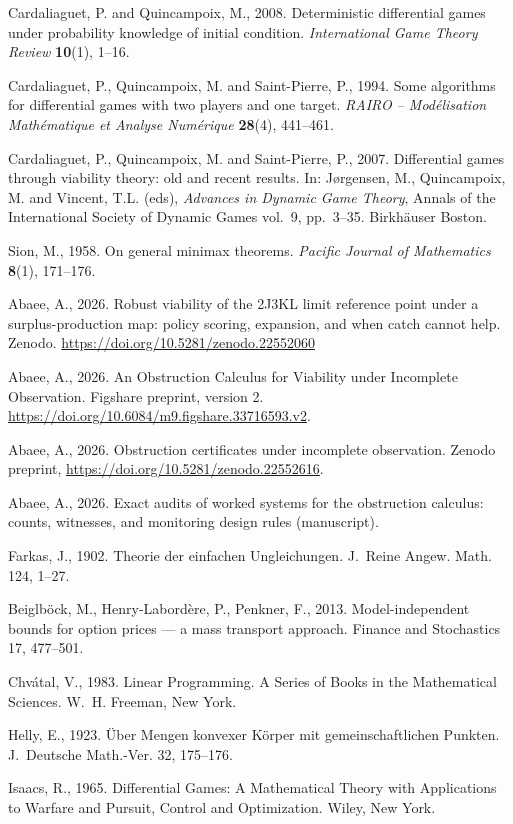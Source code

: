 \documentclass[10pt,twocolumn]{article}
\theoremstyle{definition}
\begin{document}
Cardaliaguet, P. and Quincampoix, M., 2008. Deterministic differential games under
probability knowledge of initial condition. \emph{International Game Theory Review}
\textbf{10}(1), 1--16.

Cardaliaguet, P., Quincampoix, M. and Saint-Pierre, P., 1994. Some algorithms for differential
games with two players and one target. \emph{RAIRO -- Mod\'elisation Math\'ematique et Analyse
Num\'erique} \textbf{28}(4), 441--461.

Cardaliaguet, P., Quincampoix, M. and Saint-Pierre, P., 2007. Differential games through
viability theory: old and recent results. In: J\o rgensen, M., Quincampoix, M. and Vincent,
T.L. (eds), \emph{Advances in Dynamic Game Theory}, Annals of the International Society of
Dynamic Games vol.\ 9, pp.\ 3--35. Birkh\"auser Boston.

Sion, M., 1958. On general minimax theorems. \emph{Pacific Journal of Mathematics}
\textbf{8}(1), 171--176.


Abaee, A., 2026. Robust viability of the 2J3KL limit reference point
under a surplus-production map: policy scoring, expansion, and when catch
cannot help. Zenodo. \url{https://doi.org/10.5281/zenodo.22552060}

Abaee, A., 2026. An Obstruction Calculus for Viability under Incomplete Observation. Figshare preprint, version 2. \url{https://doi.org/10.6084/m9.figshare.33716593.v2}.

Abaee, A., 2026. Obstruction certificates under incomplete observation. Zenodo preprint, \url{https://doi.org/10.5281/zenodo.22552616}.

Abaee, A., 2026. Exact audits of worked systems for the obstruction calculus:
counts, witnesses, and monitoring design rules (manuscript).

Farkas, J., 1902. Theorie der einfachen Ungleichungen. J.\ Reine Angew.
Math. 124, 1--27.


Beiglb\"ock, M., Henry-Labord\`ere, P., Penkner, F., 2013.
Model-independent bounds for option prices --- a mass transport approach.
Finance and Stochastics 17, 477--501.

Chv\'{a}tal, V., 1983. Linear Programming. A Series of Books in the
Mathematical Sciences. W.~H. Freeman, New York.

Helly, E., 1923. \"Uber Mengen konvexer K\"orper mit gemeinschaftlichen
Punkten. J.~Deutsche Math.-Ver. 32, 175--176.

Isaacs, R., 1965. Differential Games: A Mathematical Theory with
Applications to Warfare and Pursuit, Control and Optimization. Wiley,
New York.
\end{document}
